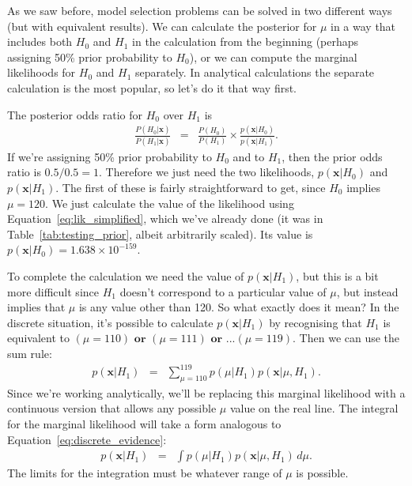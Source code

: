 As we saw before, model selection problems can be solved in two different ways
(but with equivalent results). We can calculate the posterior for $\mu$ in
a way that includes both $H_0$ and $H_1$ in the calculation from the beginning
(perhaps assigning 50\% prior probability to $H_0$), or we can compute the
marginal likelihoods for $H_0$ and $H_1$ separately. In analytical calculations
the separate calculation is the most popular, so let's do it that way first.

The posterior odds ratio for $H_0$ over $H_1$ is
\begin{eqnarray}
\frac{P(H_0 | \boldsymbol{x})}{P(H_1|\boldsymbol{x})} &=& \frac{P(H_0)}{P(H_1)} \times
\frac{p(\boldsymbol{x}|H_0)}{p(\boldsymbol{x}|H_1)}\label{eq:odds_form2}.
\end{eqnarray}
If we're assigning 50\% prior probability to $H_0$ and to $H_1$, then the
prior odds ratio is $0.5 / 0.5 = 1$. Therefore we just need the two likelihoods,
$p(\boldsymbol{x} | H_0)$ and $p(\boldsymbol{x} | H_1)$. The first of these is fairly straightforward to
get, since $H_0$ implies $\mu = 120$. We just calculate the value of the
likelihood using Equation~\ref{eq:lik_simplified}, which we've already done
(it was in Table~\ref{tab:testing_prior}, albeit arbitrarily scaled). Its value
is $p(\boldsymbol{x} | H_0) = 1.638 \times 10^{-159}$.

To complete the calculation we need the value of $p(\boldsymbol{x}|H_1)$, but
this is a bit more difficult since $H_1$ doesn't correspond to a particular
value of $\mu$, but instead implies that $\mu$ is any value other than 120.
So what exactly does it mean? In the discrete situation, it's possible to
calculate $p(\boldsymbol{x}|H_1)$ by recognising that $H_1$ is equivalent to
$(\mu = 110) \textbf{ or } (\mu = 111) \textbf{ or }... (\mu = 119)$. Then
we can use the sum rule:
\begin{eqnarray}
p(\boldsymbol{x}|H_1) &=& \sum_{\mu=110}^{119} p(\mu | H_1)
p(\boldsymbol{x}|\mu, H_1).\label{eq:discrete_evidence}
\end{eqnarray}
Since we're working analytically, we'll be replacing this marginal likelihood
with a continuous version that allows any possible $\mu$ value on the real line.
The integral for the marginal likelihood will take a form analogous to
Equation~\ref{eq:discrete_evidence}:
\begin{eqnarray}
p(\boldsymbol{x}|H_1) &=& \int p(\mu | H_1)
p(\boldsymbol{x}|\mu, H_1) \, d\mu.\label{eq:continuous_evidence}
\end{eqnarray}
The limits for the integration must be whatever range of $\mu$ is possible.

